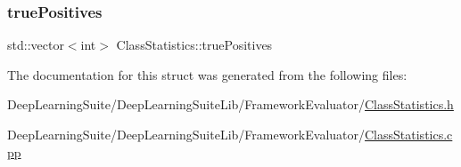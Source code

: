 \mbox{\label{struct_class_statistics_a07e9de84d5cda8ee5b91d54f8d8685b1}} 
\subsubsection{\texorpdfstring{true\+Positives}{truePositives}}
{\footnotesize\ttfamily std\+::vector$<$int$>$ Class\+Statistics\+::true\+Positives}



The documentation for this struct was generated from the following files\+:\begin{DoxyCompactItemize}
\item 
Deep\+Learning\+Suite/\+Deep\+Learning\+Suite\+Lib/\+Framework\+Evaluator/\hyperlink{_class_statistics_8h}{Class\+Statistics.\+h}\item 
Deep\+Learning\+Suite/\+Deep\+Learning\+Suite\+Lib/\+Framework\+Evaluator/\hyperlink{_class_statistics_8cpp}{Class\+Statistics.\+cpp}\end{DoxyCompactItemize}
